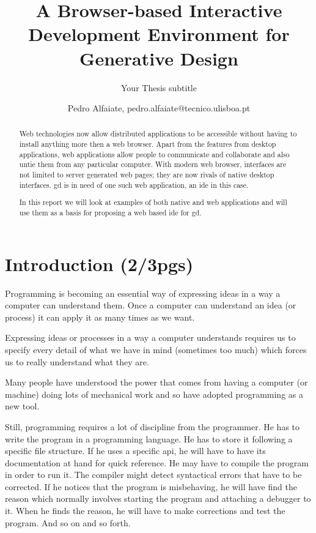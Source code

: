 \documentclass{./llncs2e/llncs}
\begin{document}
\title{A Browser-based Interactive Development Environment for Generative Design}

\subtitle{Your Thesis subtitle}
\author{Pedro Alfaiate, pedro.alfaiate@tecnico.ulisboa.pt}

\maketitle

\begin{abstract}
	Web technologies now allow distributed applications to be accessible without having to install anything more then a web browser.
	Apart from the features from desktop applications, web applications allow people to communicate and collaborate and also untie them from any particular computer.
	With modern web browser, interfaces are not limited to server generated web pages;
	they are now rivals of native desktop interfaces.
	\ac{gd} is in need of one such web application, an \ac{ide} in this case.
	
	In this report we will look at examples of both native and web applications and will use them as a basis for proposing a web based \ac{ide} for \ac{gd}.
\end{abstract}
\begin{keywords}

\end{keywords}
\section{Introduction (2/3pgs)}
	Programming is becoming an essential way of expressing ideas in a way a computer can understand them.
	Once a computer can understand an idea (or process) it can apply it as many times as we want.

	Expressing ideas or processes in a way a computer understands requires us to specify every detail of what we have in mind (sometimes too much) which forces us to really understand what they are.

	Many people have understood the power that comes from having a computer (or machine) doing lots of mechanical work and so have adopted programming as a new tool.

	Still, programming requires a lot of discipline from the programmer.
	He has to write the program in a programming language.
	He has to store it following a specific file structure.
	If he uses a specific \ac{api}, he will have to have its documentation at hand for quick reference.
	He may have to compile the program in order to run it.
	The compiler might detect syntactical errors that have to be corrected.
	If he notices that the program is misbehaving, he will have find the reason which normally involves starting the program and attaching a debugger to it.
	When he finds the reason, he will have to make corrections and test the program.
	And so on and so forth.
\end{document}
